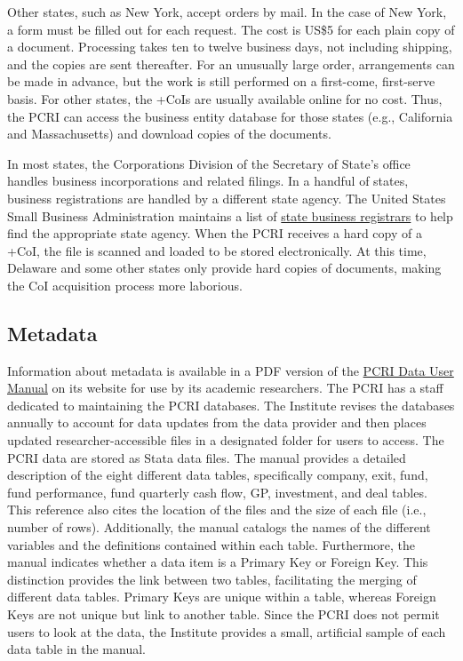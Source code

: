 \documentclass[
]{book}
\begin{document}
Other states, such as New York, accept orders by mail. In the case of New York, a form must be filled out for each request. The cost is US\$5 for each plain copy of a document. Processing takes ten to twelve business days, not including shipping, and the copies are sent thereafter. For an unusually large order, arrangements can be made in advance, but the work is still performed on a first-come, first-serve basis. For other states, the +CoIs\textbar{} are usually available online for no cost. Thus, the PCRI can access the business entity database for those states (e.g., California and Massachusetts) and download copies of the documents.

In most states, the Corporations Division of the Secretary of State's office handles business incorporations and related filings. In a handful of states, business registrations are handled by a different state agency. The United States Small Business Administration maintains a list of \href{https://www.sba.gov/business-guide/launch-your-business/register-your-business\#section-header-6}{state business registrars} to help find the appropriate state agency. When the PCRI receives a hard copy of a +CoI\textbar, the file is scanned and loaded to be stored electronically. At this time, Delaware and some other states only provide hard copies of documents, making the CoI acquisition process more laborious.

\hypertarget{metadata-1}{%
\subsection{Metadata}\label{metadata-1}}

Information about metadata is available in a PDF version of the \href{http://privatecapitalresearchinstitute.org/images/news/pcri_manual_2_4.pdf}{PCRI Data User Manual} on its website for use by its academic researchers. The PCRI has a staff dedicated to maintaining the PCRI databases. The Institute revises the databases annually to account for data updates from the data provider and then places updated researcher-accessible files in a designated folder for users to access. The PCRI data are stored as Stata data files. The manual provides a detailed description of the eight different data tables, specifically company, exit, fund, fund performance, fund quarterly cash flow, GP, investment, and deal tables. This reference also cites the location of the files and the size of each file (i.e., number of rows). Additionally, the manual catalogs the names of the different variables and the definitions contained within each table. Furthermore, the manual indicates whether a data item is a Primary Key or Foreign Key. This distinction provides the link between two tables, facilitating the merging of different data tables. Primary Keys are unique within a table, whereas Foreign Keys are not unique but link to another table. Since the PCRI does not permit users to look at the data, the Institute provides a small, artificial sample of each data table in the manual.
\end{document}
